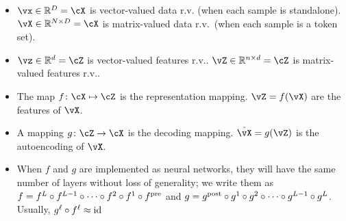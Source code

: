 \begin{itemize}
    \item \(\vx \in \R^{D} = \cX\) is vector-valued data r.v. (when each sample is standalone). \(\vX \in \R^{N \times D} = \cX\) is matrix-valued data r.v.~(when each sample is a token set).
    \item \(\vz \in \R^{d} = \cZ\) is vector-valued features r.v.. \(\vZ \in \R^{n \times d} = \cZ\) is matrix-valued features r.v..
    \item The map \(f \colon \cX \mapsto \cZ\) is the representation mapping. \(\vZ = f(\vX)\) are the features of \(\vX\).
    \item A mapping \(g \colon \cZ \to \cX\) is the decoding mapping. \(\hat{\vX} = g(\vZ)\) is the autoencoding of \(\vX\). %
    \item When \(f\) and \(g\) are implemented as neural networks, they will have the same number of layers without loss of generality; we write them as \(f = f^{L} \circ f^{L - 1} \circ \cdots \circ f^{2} \circ f^{1} \circ f^{\mathrm{pre}}\) and \(g = g^{\mathrm{post}} \circ g^{1} \circ g^{2} \circ \cdots \circ g^{L - 1} \circ g^{L}\). Usually, {\(g^{\ell} \circ f^{\ell} \approx \operatorname{id}\)} 
\end{itemize}

